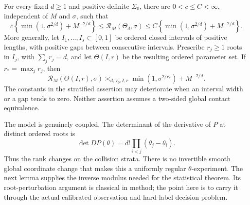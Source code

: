 \begin{theorem}\label{thm:v4-roots}
For every fixed $d\ge1$ and positive-definite $\Sigma_0$, there are
$0<c\le C<\infty$, independent of $M$ and $\sigma$, such that
\begin{equation}
 c\left\{\min(1,\sigma^{2/d})+M^{-2/d}\right\}
 \le\mathcal R_M(\Theta_d,\sigma)
 \le C\left\{\min(1,\sigma^{2/d})+M^{-2/d}\right\}.               \label{eq:v4-global-root-rate}
\end{equation}
More generally, let $I_1,\ldots,I_s\subset[0,1]$ be ordered closed
intervals of positive lengths, with positive gaps between consecutive
intervals. Prescribe $r_j\ge1$ roots in $I_j$, with $\sum_jr_j=d$,
and let $\Theta(I,r)$ be the resulting ordered parameter set.
If $r_* =\max_jr_j$, then
\begin{equation}
 \mathcal R_M(\Theta(I,r),\sigma)
 \asymp_{d,V_0,I,r}
       \min(1,\sigma^{2/r_*})+M^{-2/d}.                         \label{eq:v4-stratified-root-rate}
\end{equation}
The constants in the stratified assertion may deteriorate when an
interval width or a gap tends to zero. Neither assertion assumes a
two-sided global contact equivalence.
\end{theorem}

The model is genuinely coupled. The determinant of the derivative of
$P$ at distinct ordered roots is
\begin{equation}
 \det DP(\theta)=d!\prod_{i<j}(\theta_j-\theta_i).                \label{eq:v4-vandermonde-rank}
\end{equation}
Thus the rank changes on the collision strata. There is no invertible
smooth global coordinate change that makes this a uniformly regular
$\theta$-experiment. The next lemma supplies the inverse modulus
needed for the statistical theorem. Its root-perturbation argument
is classical in method; the point here is to carry it through the
actual calibrated observation and hard-label decision problem.

